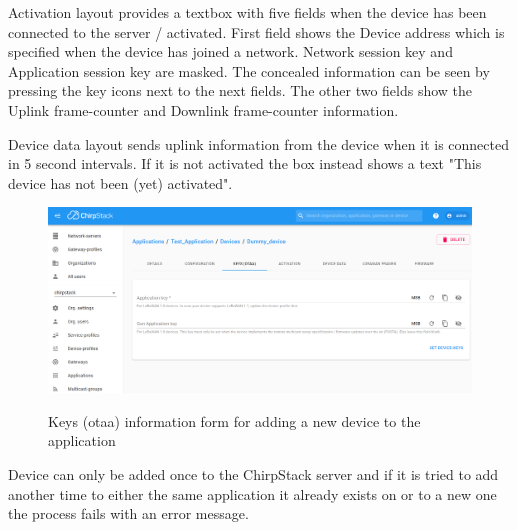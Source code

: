 Activation layout provides a textbox with five fields when the device has been connected to the server / activated.
First field shows the Device address which is specified when the device has joined a network.
Network session key and Application session key are masked.
The concealed information can be seen by pressing the key icons next to the next fields.
The other two fields show the Uplink frame-counter and Downlink frame-counter information.

Device data layout sends uplink information from the device when it is connected in 5 second intervals.
If it is not activated the box instead shows a text "This device has not been (yet) activated".


\begin{figure}[ht]
  \centering
  {\includegraphics[width=\textwidth]{illustration/ChirpStack_new_device_2.png}}
  \caption{Keys (\gls{otaa}) information form for adding a new device to the application}
  \label{fig:ChirpStack_new_device_2}
\end{figure}

Device can only be added once to the ChirpStack server and if it is tried to add another time to either the same application it already exists on or to a new one the process fails with an error message.


\clearpage %
